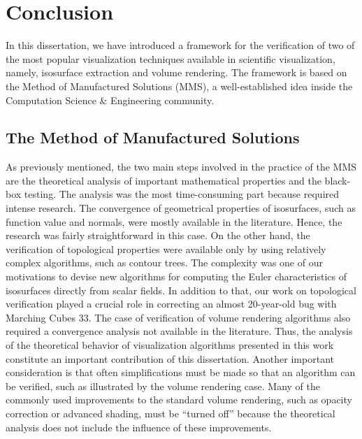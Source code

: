 \chapter{Conclusion}
\label{chap:conclusion}


In this dissertation, we have introduced a framework for the verification of two of the most popular visualization techniques available in scientific visualization, namely, isosurface extraction and volume rendering. The framework is based on the Method of Manufactured Solutions (MMS), a well-established idea inside the Computation Science \& Engineering community. 


\section{The Method of Manufactured Solutions}

As previously mentioned, the two main steps involved in the practice of the MMS are the theoretical analysis of important mathematical properties and the black-box testing. 
%
The analysis was the most time-consuming part because required intense research.
%
%
%
The convergence of geometrical properties of isosurfaces, such as function value and normals, were mostly available in the literature. Hence, the research was fairly straightforward in this case.
%
On the other hand, the verification of topological properties were available only by using relatively complex algorithms, such as contour trees. 
%
The complexity was one of our motivations to devise new algorithms for computing the Euler characteristics of isosurfaces directly from scalar fields.
%
In addition to that, our work on topological verification played a crucial role in correcting an almost 20-year-old bug with Marching Cubes 33.
%
The case of verification of volume rendering algorithms also required a convergence analysis not available in the literature. 
%
Thus, the analysis of the theoretical behavior of visualization algorithms presented in this work constitute an important contribution of this dissertation. 
%
Another important consideration is that often simplifications must be made so that an algorithm can be verified, such as illustrated 
by the volume rendering case.
%
Many of the commonly used improvements to the standard volume rendering, such as opacity correction or advanced shading, must be ``turned off'' because the theoretical analysis does not include the influence of these improvements.


